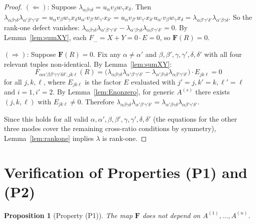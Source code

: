 \documentclass[12pt]{article}
\newtheorem{proposition}[theorem]{Proposition}
\begin{document}
\begin{proof}
$(\Leftarrow)$: Suppose $\lambda_{\alpha\beta\gamma\delta}=u_\alpha v_\beta w_\gamma x_\delta$.
Then $\lambda_{\alpha\beta\gamma\delta}\lambda_{\alpha'\beta'\gamma'\delta'}=u_\alpha v_\beta w_\gamma x_\delta
u_{\alpha'}v_{\beta'}w_{\gamma'}x_{\delta'}=u_\alpha v_{\beta'}w_{\gamma'}x_{\delta'}
u_{\alpha'}v_\beta w_\gamma x_\delta=\lambda_{\alpha\beta'\gamma'\delta'}\lambda_{\alpha'\beta\gamma\delta}$.
So the rank-one defect vanishes: $\lambda_{\alpha\beta\gamma\delta}\lambda_{\alpha'\beta'\gamma'\delta'}
-\lambda_{\alpha'\beta\gamma\delta}\lambda_{\alpha\beta'\gamma'\delta'}=0$.
By Lemma~\ref{lem:sumXY}, each $F_{\ldots}=X+Y=0\cdot E=0$, so $\mathbf{F}(R)=0$.

$(\Rightarrow)$: Suppose $\mathbf{F}(R)=0$.  Fix any $\alpha\neq\alpha'$ and $\beta,\beta',\gamma,\gamma',\delta,\delta'$
with all four relevant tuples non-identical.  By Lemma~\ref{lem:sumXY}:
\[
  F_{\alpha\alpha'\beta\beta'\gamma\gamma'\delta\delta',jk\ell}(R)
  = \bigl(\lambda_{\alpha\beta\gamma\delta}\lambda_{\alpha'\beta'\gamma'\delta'}
    -\lambda_{\alpha'\beta\gamma\delta}\lambda_{\alpha\beta'\gamma'\delta'}\bigr)\cdot E_{jk\ell} = 0
\]
for all $j,k,\ell$, where $E_{jk\ell}$ is the factor $E$ evaluated with $j'=j,k'=k,\ell'=\ell$
and $i=1,i'=2$.  By Lemma~\ref{lem:Enonzero}, for generic $A^{(s)}$ there exists $(j,k,\ell)$
with $E_{jk\ell}\neq 0$.  Therefore
$\lambda_{\alpha\beta\gamma\delta}\lambda_{\alpha'\beta'\gamma'\delta'}=\lambda_{\alpha'\beta\gamma\delta}\lambda_{\alpha\beta'\gamma'\delta'}$.

Since this holds for all valid $\alpha,\alpha',\beta,\beta',\gamma,\gamma',\delta,\delta'$
(the equations for the other three modes cover the remaining cross-ratio conditions by symmetry),
Lemma~\ref{lem:rankone} implies $\lambda$ is rank-one.
\end{proof}

\section{Verification of Properties (P1) and (P2)}

\begin{proposition}[Property (P1)]\label{prop:P1}
The map $\mathbf{F}$ does not depend on $A^{(1)},\dots,A^{(n)}$.
\end{proposition}
\end{document}
